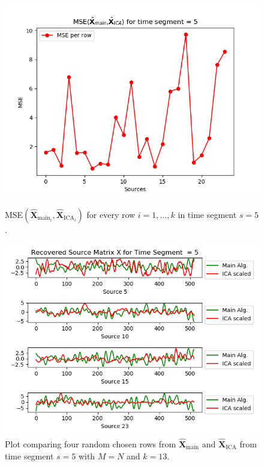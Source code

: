 \begin{figure}[H]
\begin{widepage}
    \begin{minipage}[t]{.45\textwidth}
\centering
\includegraphics[width=1\linewidth]{figures/ch_7/resultat/mse_none_removed_ica_timeseg5.png}
\caption{MSE$\left(\hat{\mathbf{X}}_{\text{main}_{i}},\hat{\mathbf{X}}_{\text{ICA}_{i}}\right)$ for every row $i = 1, \dots, k$ in time segment $s=5$.}
\label{fig:M=N_2}
\end{minipage} 
\hspace{0.5cm}
\begin{minipage}[t]{.45\textwidth}
\centering
\includegraphics[width=1\linewidth]{figures/ch_7/resultat/EEG_none_removed_scaled_timeseg5S1_CClean.png}
\caption{Plot comparing four random chosen rows from $\hat{\mathbf{X}}_{\text{main}}$ and $\hat{\mathbf{X}}_{\text{ICA}}$ from time segment $s = 5$ with $M = N$ and $k=13$.}
	\label{fig:M=N_3}
    \end{minipage}
\end{widepage}
\end{figure}
